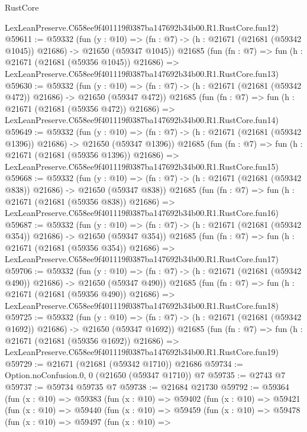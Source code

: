 \begin{lexlean}{RustCore}
\begin{coremodule}
    LexLeanPreserve.C658ee9f401119f0387ba147692b34b00.R1.RustCore.fun12)
@59611 := @59332
    (fun (y : @10) =>
    (fn : @7) -> (h : @21671 (@21681 (@59342 @1045)) @21686) -> @21650 (@59347 @1045))
    @21685
    (fun (fn : @7) =>
    fun (h : @21671 (@21681 (@59356 @1045)) @21686) =>
    LexLeanPreserve.C658ee9f401119f0387ba147692b34b00.R1.RustCore.fun13)
@59630 := @59332
    (fun (y : @10) =>
    (fn : @7) -> (h : @21671 (@21681 (@59342 @472)) @21686) -> @21650 (@59347 @472))
    @21685
    (fun (fn : @7) =>
    fun (h : @21671 (@21681 (@59356 @472)) @21686) =>
    LexLeanPreserve.C658ee9f401119f0387ba147692b34b00.R1.RustCore.fun14)
@59649 := @59332
    (fun (y : @10) =>
    (fn : @7) -> (h : @21671 (@21681 (@59342 @1396)) @21686) -> @21650 (@59347 @1396))
    @21685
    (fun (fn : @7) =>
    fun (h : @21671 (@21681 (@59356 @1396)) @21686) =>
    LexLeanPreserve.C658ee9f401119f0387ba147692b34b00.R1.RustCore.fun15)
@59668 := @59332
    (fun (y : @10) =>
    (fn : @7) -> (h : @21671 (@21681 (@59342 @838)) @21686) -> @21650 (@59347 @838))
    @21685
    (fun (fn : @7) =>
    fun (h : @21671 (@21681 (@59356 @838)) @21686) =>
    LexLeanPreserve.C658ee9f401119f0387ba147692b34b00.R1.RustCore.fun16)
@59687 := @59332
    (fun (y : @10) =>
    (fn : @7) -> (h : @21671 (@21681 (@59342 @354)) @21686) -> @21650 (@59347 @354))
    @21685
    (fun (fn : @7) =>
    fun (h : @21671 (@21681 (@59356 @354)) @21686) =>
    LexLeanPreserve.C658ee9f401119f0387ba147692b34b00.R1.RustCore.fun17)
@59706 := @59332
    (fun (y : @10) =>
    (fn : @7) -> (h : @21671 (@21681 (@59342 @490)) @21686) -> @21650 (@59347 @490))
    @21685
    (fun (fn : @7) =>
    fun (h : @21671 (@21681 (@59356 @490)) @21686) =>
    LexLeanPreserve.C658ee9f401119f0387ba147692b34b00.R1.RustCore.fun18)
@59725 := @59332
    (fun (y : @10) =>
    (fn : @7) -> (h : @21671 (@21681 (@59342 @1692)) @21686) -> @21650 (@59347 @1692))
    @21685
    (fun (fn : @7) =>
    fun (h : @21671 (@21681 (@59356 @1692)) @21686) =>
    LexLeanPreserve.C658ee9f401119f0387ba147692b34b00.R1.RustCore.fun19)
@59729 := @21671 (@21681 (@59342 @1710)) @21686
@59734 := Option.noConfusion.{0, 0} (@21650 (@59347 @1710)) @7
@59735 := @2743 @7
@59737 := @59734 @59735 @7
@59738 := @21684 @21730
@59792 := @59364
    (fun (x : @10) =>
    @59383
      (fun (x : @10) =>
      @59402
        (fun (x : @10) =>
        @59421
          (fun (x : @10) =>
          @59440
            (fun (x : @10) =>
            @59459
              (fun (x : @10) =>
              @59478
                (fun (x : @10) =>
                @59497
                  (fun (x : @10) =>

\end{coremodule}
\end{lexlean}
